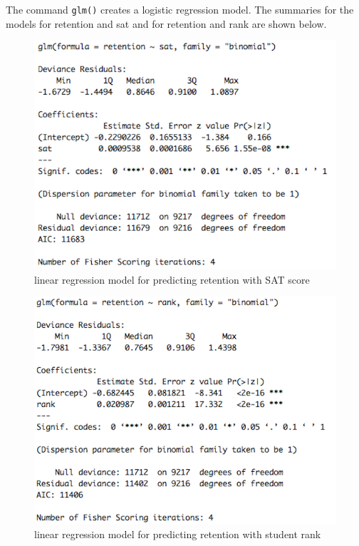 \documentclass{article}
\begin{document}
The command \verb|glm()| creates a logistic regression model. 
The summaries for the models for retention and sat and for retention and rank are shown below. 
\begin{figure}[H]
\begin{center}
\includegraphics[scale=0.55]{retentionsat}
\end{center}
\caption{linear regression model for predicting retention with SAT score}
\end{figure}

\begin{figure}[H]
\begin{center}
\includegraphics[scale=0.45]{retentionrankglm}
\end{center}
\caption{linear regression model for predicting retention with student rank}
\end{figure}
\end{document}
